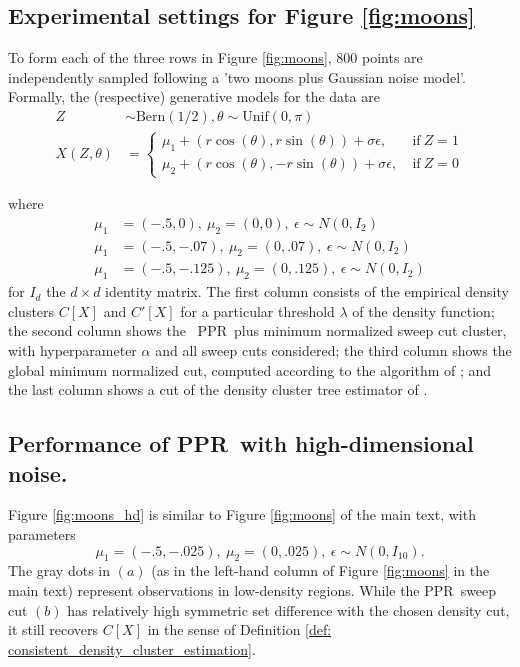 \documentclass[11pt,twoside]{article}
\newcommand{\1}{\mathbbm{1}}
\newcommand{\Xbf}{X}
\newcommand{\pprspace}{{\sc PPR~}}
\begin{document}
\subsection{Experimental settings for Figure \ref{fig:moons}}

To form each of the three rows in Figure \ref{fig:moons}, 800 points are independently sampled following a 'two moons plus Gaussian noise model'. Formally, the (respective) generative models for the data are
\begin{align}
Z & \sim \textrm{Bern}(1/2), \theta \sim \textrm{Unif}(0, \pi) \\
X(Z,\theta) & = 
\begin{cases}
\mu_1 + (r \cos(\theta), r \sin(\theta)) + \sigma \epsilon,~ & \text{if}~ Z = 1 \\
\mu_2 + (r \cos(\theta), - r \sin(\theta)) + \sigma \epsilon,~ & \text{if}~ Z = 0
\end{cases}
\end{align}

where 
\begin{align*}
\mu_1 & = (-.5, 0),~ \mu_2 = (0,0),~ \epsilon \sim N(0, I_2) \tag{row 1} \\
\mu_1 & = (-.5, -.07),~ \mu_2 = (0,.07),~ \epsilon \sim N(0, I_2) \tag{row 2} \\
\mu_1 & = (-.5, -.125),~ \mu_2 = (0,.125),~ \epsilon \sim N(0, I_2) \tag{row 3} 
\end{align*}
for $I_d$ the $d \times d$ identity matrix. The first column consists of the empirical density clusters $C[\Xbf]$ and $C'[\Xbf]$ for a particular threshold $\lambda$ of the density function; the second column shows the ~\pprspace plus minimum normalized sweep cut cluster, with hyperparameter $\alpha$ and all sweep cuts considered; the third column shows the global minimum normalized cut, computed according to the algorithm of \cite{szlam2010}; and the last column shows a cut of the density cluster tree estimator of \cite{chaudhuri2010}.

\subsection{Performance of \pprspace with high-dimensional noise.}

Figure \ref{fig:moons_hd} is similar to Figure \ref{fig:moons} of the main text, with parameters
\begin{equation*}
\mu_1 = (-.5, -.025),~ \mu_2 = (0,.025),~ \epsilon \sim N(0, I_{10}).
\end{equation*}
The gray dots in $(a)$ (as in the left-hand column of Figure \ref{fig:moons} in the main text) represent observations in low-density regions. While the \pprspace sweep cut $(b)$ has relatively high symmetric set difference with the chosen density cut, it still recovers $C[\Xbf]$ in the sense of Definition \ref{def: consistent_density_cluster_estimation}.
\end{document}
